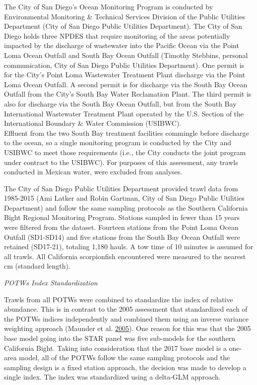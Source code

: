 \documentclass[12pt,]{article}
\begin{document}
The City of San Diego's Ocean Monitoring Program is conducted by
Environmental Monitoring \& Technical Services Division of the Public
Utilities Department (City of San Diego Public Utilities Department).
The City of San Diego holds three NPDES that require monitoring of the
areas potentially impacted by the discharge of wastewater into the
Pacific Ocean via the Point Loma Ocean Outfall and South Bay Ocean
Outfall (Timothy Stebbins, personal communication, City of San Diego
Public Utilities Department). One permit is for the City's Point Loma
Wastewater Treatment Plant discharge via the Point Loma Ocean Outfall. A
second permit is for discharge via the South Bay Ocean Outfall from the
City's South Bay Water Reclamation Plant. The third permit is also for
discharge via the South Bay Ocean Outfall, but from the South Bay
International Wastewater Treatment Plant operated by the U.S. Section of
the International Boundary \& Water Commission (USIBWC).\\
Effluent from the two South Bay treatment facilities commingle before
discharge to the ocean, so a single monitoring program is conducted by
the City and USIBWC to meet those requirements (i.e., the City conducts
the joint program under contract to the USIBWC). For purposes of this
assessment, any trawls conducted in Mexican water, were excluded from
analyses.

The City of San Diego Public Utilities Department provided trawl data
from 1985-2015 (Ami Latker and Robin Gartman, City of San Diego Public
Utilities Department) and follow the same sampling protocols as the
Southern California Bight Regional Monitoring Program. Stations sampled
in fewer than 15 years were filtered from the dataset. Fourteen stations
from the Point Loma Ocean Outfall (SD1-SD14) and five stations from the
South Bay Ocean Outfall were retained (SD17-21), totaling 1,180 hauls. A
tow time of 10 minutes is assumed for all trawls. All California
scorpionfish encountered were measured to the nearest cm (standard
length).

\emph{POTWs Index Standardization}

Trawls from all POTWs were combined to standardize the index of relative
abundance. This is in contrast to the 2005 assessment that standardized
each of the POTWs indices independently and combined them using an
inverse variance weighting approach (Maunder et al.
\protect\hyperlink{ref-Maunder2005}{2005}). One reason for this was that
the 2005 base model going into the STAR panel was five sub-models for
the southern California Bight. Taking into consideration that the 2017
base model is a one-area model, all of the POTWs follow the same
sampling protocols and the sampling design is a fixed station approach,
the decision was made to develop a single index. The index was
standardized using a delta-GLM approach.
\end{document}
